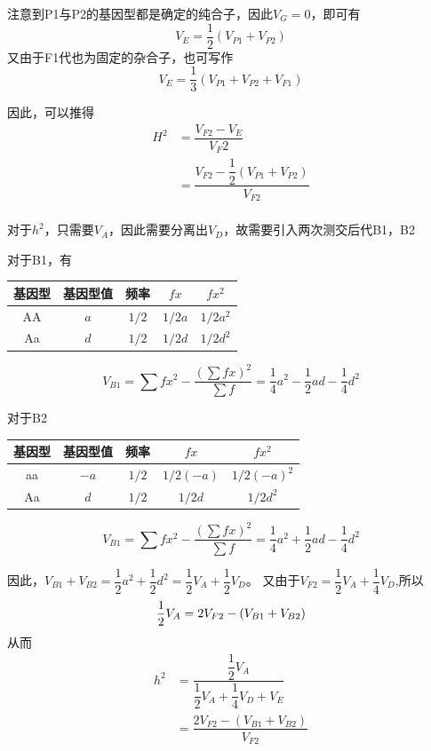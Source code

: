 \documentclass[a4paper, 12pt]{report}
\begin{document}
注意到P1与P2的基因型都是确定的纯合子，因此\(V_G=0\)，即可有
\[V_E=\dfrac{1}{2}(V_{P1}+V_{P2})\]
又由于F1代也为固定的杂合子，也可写作
\[V_E=\dfrac{1}{3}(V_{P1}+V_{P2}+V_{F1})\]

因此，可以推得
\[
    \begin{aligned}
        H^2 & =\dfrac{V_{F2}-V_E}{V_F2}                           \\
            & =\dfrac{V_{F2}-\dfrac{1}{2}(V_{P1}+V_{P2})}{V_{F2}} \\
    \end{aligned}
\]

对于\(h^2\)，只需要\(V_A\)，因此需要分离出\(V_D\)，故需要引入两次测交后代B1，B2

对于B1，有
\begin{center}
    \begin{tabular}{ccccc}
        基因型 & 基因型值  & 频率      & \(fx\)   & \(fx^2\)   \\
        \hline
        AA  & \(a\) & \(1/2\) & \(1/2a\) & \(1/2a^2\) \\
        Aa  & \(d\) & \(1/2\) & \(1/2d\) & \(1/2d^2\) \\
    \end{tabular}
\end{center}
\[
    V_{B1}=\sum fx^2-\dfrac{(\sum fx)^2}{\sum f}=\dfrac{1}{4}a^2-\dfrac{1}{2}ad-\dfrac{1}{4}d^2
\]

对于B2
\begin{center}
    \begin{tabular}{ccccc}
        基因型 & 基因型值   & 频率      & \(fx\)      & \(fx^2\)      \\
        \hline
        aa  & \(-a\) & \(1/2\) & \(1/2(-a)\) & \(1/2(-a)^2\) \\
        Aa  & \(d\)  & \(1/2\) & \(1/2d\)    & \(1/2d^2\)    \\
    \end{tabular}
\end{center}
\[
    V_{B1}=\sum fx^2-\dfrac{(\sum fx)^2}{\sum f}=\dfrac{1}{4}a^2+\dfrac{1}{2}ad-\dfrac{1}{4}d^2
\]

因此，\(V_{B1}+V_{B2}=\dfrac{1}{2}a^2+\dfrac{1}{2}d^2=\dfrac{1}{2}V_A+\dfrac{1}{2}V_D\)。
又由于\(V_{F2}=\dfrac{1}{2}V_A+\dfrac{1}{4}V_D\),所以
\[
    \dfrac{1}{2}V_A=2V_{F2}-(V_{B1}+V_{B2})\\
\]
从而
\[
    \begin{aligned}
        h^2 & =\dfrac{\dfrac{1}{2}V_A}{\dfrac{1}{2}V_A+\dfrac{1}{4}V_D+V_E} \\
            & =\dfrac{2V_{F2}-(V_{B1}+V_{B2})}{V_{F2}}                      \\
    \end{aligned}
\]
\end{document}
